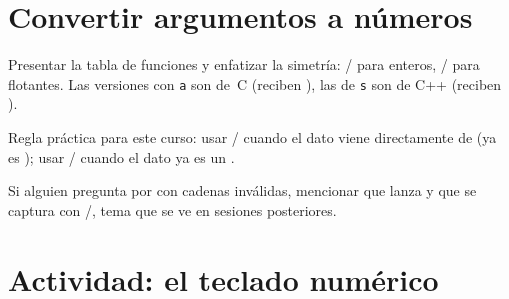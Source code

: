 \documentclass[12pt, oneside]{article}
\begin{document}
\section{Convertir argumentos a números}

\begin{notaprofesor}
  Presentar la tabla de funciones y enfatizar la simetría:
  / para enteros, / para
  flotantes.  Las versiones con \texttt{a} son de~C (reciben
  ), las de \texttt{s} son de C++ (reciben ).
  \par\smallskip
  Regla práctica para este curso: usar /
  cuando el dato viene directamente de  (ya es );
  usar / cuando el dato ya es un .
  \par\smallskip
  Si alguien pregunta por  con cadenas inválidas, mencionar
  que lanza  y que se captura con
  /, tema que se ve en sesiones posteriores.
\end{notaprofesor}

\section{Actividad: el teclado numérico}
\end{document}
